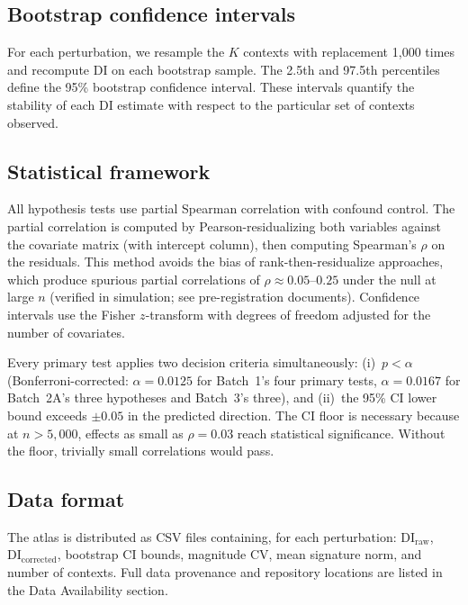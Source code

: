 \documentclass[11pt]{article}
\begin{document}
\subsection{Bootstrap confidence intervals}

For each perturbation, we resample the $K$ contexts with replacement
1{,}000 times and recompute DI on each bootstrap sample.  The 2.5th and
97.5th percentiles define the 95\% bootstrap confidence interval.  These
intervals quantify the stability of each DI estimate with respect to the
particular set of contexts observed.

\subsection{Statistical framework}

All hypothesis tests use partial Spearman correlation with confound
control.  The partial correlation is computed by Pearson-residualizing
both variables against the covariate matrix (with intercept column),
then computing Spearman's $\rho$ on the residuals.  This method avoids
the bias of rank-then-residualize approaches, which produce spurious
partial correlations of $\rho \approx 0.05$--$0.25$ under the null at
large $n$ (verified in simulation; see pre-registration documents).
Confidence intervals use the Fisher $z$-transform with degrees of
freedom adjusted for the number of covariates.

Every primary test applies two decision criteria simultaneously:
(i)~$p < \alpha$ (Bonferroni-corrected: $\alpha = 0.0125$ for Batch~1's
four primary tests, $\alpha = 0.0167$ for Batch~2A's three hypotheses
and Batch~3's three), and (ii)~the 95\% CI lower bound
exceeds $\pm 0.05$ in the predicted direction.  The CI floor is
necessary because at $n > 5{,}000$, effects as small as
$\rho = 0.03$ reach statistical significance.  Without the floor,
trivially small correlations would pass.

\subsection{Data format}

The atlas is distributed as CSV files containing, for each perturbation:
$\mathrm{DI}_{\mathrm{raw}}$, $\mathrm{DI}_{\mathrm{corrected}}$,
bootstrap CI bounds, magnitude CV, mean signature norm, and number of
contexts.  Full data provenance and repository locations are listed in
the Data Availability section.


\end{document}
